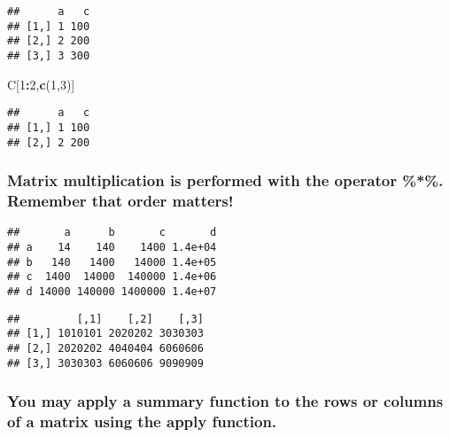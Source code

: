 \documentclass[]{article}
\newenvironment{Shaded}{\begin{snugshade}}{\end{snugshade}}
\newcommand{\KeywordTok}[1]{\textcolor[rgb]{0.13,0.29,0.53}{\textbf{#1}}}
\newcommand{\DecValTok}[1]{\textcolor[rgb]{0.00,0.00,0.81}{#1}}
\newcommand{\OperatorTok}[1]{\textcolor[rgb]{0.81,0.36,0.00}{\textbf{#1}}}
\newcommand{\NormalTok}[1]{#1}
\begin{document}
\begin{verbatim}
##      a   c
## [1,] 1 100
## [2,] 2 200
## [3,] 3 300
\end{verbatim}

\begin{Shaded}
\begin{Highlighting}[]
\NormalTok{C[}\DecValTok{1}\OperatorTok{:}\DecValTok{2}\NormalTok{,}\KeywordTok{c}\NormalTok{(}\DecValTok{1}\NormalTok{,}\DecValTok{3}\NormalTok{)]}
\end{Highlighting}
\end{Shaded}

\begin{verbatim}
##      a   c
## [1,] 1 100
## [2,] 2 200
\end{verbatim}

\subsubsection{Matrix multiplication is performed with the operator
\%*\%. Remember that order
matters!}\label{matrix-multiplication-is-performed-with-the-operator-.-remember-that-order-matters}

\begin{Shaded}
\end{Shaded}

\begin{verbatim}
##       a      b       c       d
## a    14    140    1400 1.4e+04
## b   140   1400   14000 1.4e+05
## c  1400  14000  140000 1.4e+06
## d 14000 140000 1400000 1.4e+07
\end{verbatim}

\begin{Shaded}
\end{Shaded}

\begin{verbatim}
##         [,1]    [,2]    [,3]
## [1,] 1010101 2020202 3030303
## [2,] 2020202 4040404 6060606
## [3,] 3030303 6060606 9090909
\end{verbatim}

\subsubsection{You may apply a summary function to the rows or columns
of a matrix using the apply
function.}\label{you-may-apply-a-summary-function-to-the-rows-or-columns-of-a-matrix-using-the-apply-function.}
\end{document}
